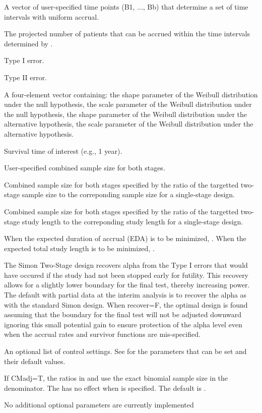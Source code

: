 \begin{Arguments}
\begin{ldescription}
\item[\code{B.init}] A vector of user-specified time points (B1, ..., Bb) that determine a
set of time intervals with uniform accrual.
\item[\code{m.init}] The projected
number of patients that can be accrued within the time intervals determined by .
\item[\code{alpha}] Type I error.
\item[\code{beta}] Type II error.
\item[\code{param}] A four-element vector containing: the shape parameter of the Weibull distribution under the
null hypothesis, the scale parameter of the Weibull distribution under the
null hypothesis, the shape parameter of the Weibull distribution under the
alternative hypothesis, the scale parameter of the Weibull distribution under the
alternative hypothesis.
\item[\code{x}] Survival time of interest (e.g., 1 year).
\item[\code{n}] User-specified combined sample size for both stages. 
\item[\code{pn}] Combined sample size for both stages specified by the
ratio of the targetted two-stage sample size to the correponding
sample size for a single-stage design.
\item[\code{pt}] Combined sample size for both stages specified by the
ratio of the targetted two-stage study length to the correponding
study length for a single-stage design.
\item[\code{target}] When the expected duration of
accrual (EDA) is to be minimized, . When the
expected total study length is to be minimized,
.
\item[\code{recover}] The Simon Two-Stage design recovers alpha from the Type I errors
that would have occured if the study had not been stopped early for
futility.  This recovery allows for a slightly lower boundary for the
final test, thereby increasing power.  The default with partial data
at the interim analysis is to recover the alpha as with the standard
Simon design.  When recover=F, the optimal design is found assuming
that the boundary for the final test will not be adjusted downward
ignoring this small potential gain to ensure protection of the alpha
level even when the accrual rates and survivor functions are mis-specified. 

\item[\code{control}] An optional list of control settings.  See
for the parameters that can be set and their default values.
\item[\code{CMadj}] If CMadj=T, the ratios in  and  use
the exact binomial sample size in the denominator. The 
has no effect when  is specified.  The default is .
\item[\code{...}] No additional optional parameters are currently implemented
\end{ldescription}
\end{Arguments}
